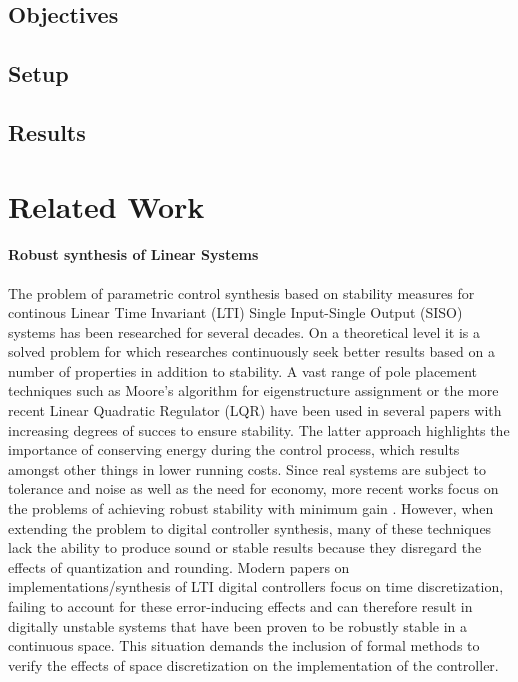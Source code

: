 \documentclass{sig-alternate-05-2015}
\begin{document}
\subsection{Objectives}
\label{experimental-objectives}

\subsection{Setup}
\label{experimental-setup}

\subsection{Results}
\label{experimental-results}

\section{Related Work}

\paragraph{Robust synthesis of Linear Systems} 

The problem of parametric control synthesis based on stability measures for continous Linear Time Invariant (LTI) Single Input-Single Output (SISO) systems has been researched for several decades. On a theoretical level it is a solved problem\cite{wonham1967pole} for which researches continuously seek better results based on a number of properties in addition to stability. A vast range of pole placement techniques such as Moore's algorithm for eigenstructure assignment \cite{klein1977eigenvalue} or the more recent Linear Quadratic Regulator (LQR) \cite{bemporad2002explicit} have been used in several papers with increasing degrees of succes to ensure stability. The latter approach highlights the importance of conserving energy during the control process, which results amongst other things in lower running costs. Since real systems are subject to tolerance and noise as well as the need for economy, more recent works focus on the problems of achieving robust stability with minimum gain \cite{schmid2014unified,konigorski2012pole}. 
However, when extending the problem to digital controller synthesis, many of these techniques lack the ability to produce sound or stable results because they disregard the effects of quantization and rounding. Modern papers on implementations/synthesis of LTI digital controllers \cite{das2013lqr,ghosh2013fpga} focus on time discretization, failing to account for these error-inducing effects and can therefore result in digitally unstable systems that have been proven to be robustly stable in a continuous space. This situation demands the inclusion of formal methods to verify the effects of space discretization on the implementation of the controller.
\end{document}
